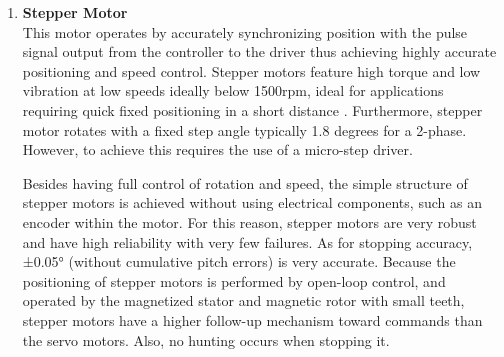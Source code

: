 \begin{enumerate}
    \item \textbf{Stepper Motor}\\
    This motor operates by accurately synchronizing position with the pulse signal output from the controller to the driver thus achieving highly accurate positioning and speed control. Stepper motors feature high torque and low vibration at low speeds ideally below 1500rpm, ideal for applications requiring quick fixed positioning in a short distance \cite{wargula2017investigations}. Furthermore, stepper motor rotates with a fixed step angle typically 1.8 degrees for a 2-phase. However, to achieve this requires the use of a micro-step driver.
    \par
    Besides having full control of rotation and speed, the simple structure of stepper motors is achieved without using electrical components, such as an encoder within the motor. For this reason, stepper motors are very robust and have high reliability with very few failures. As for stopping accuracy, ±0.05° (without cumulative pitch errors) is very accurate\cite{wargula2017investigations}. Because the positioning of stepper motors is performed by open-loop control, and operated by the magnetized stator and magnetic rotor with small teeth, stepper motors have a higher follow-up mechanism toward commands than the servo motors. Also, no hunting occurs when stopping it.
    

\end{enumerate}
